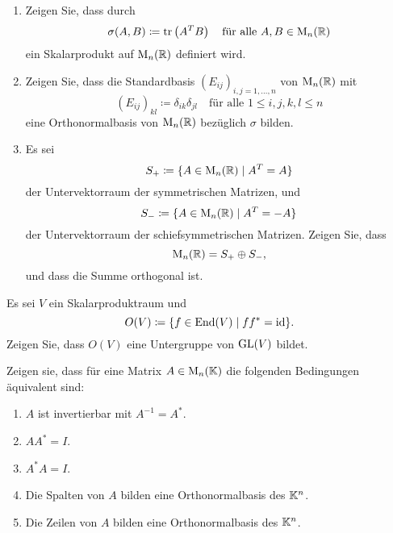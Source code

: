 \documentclass[a4paper,10pt]{scrartcl}
\begin{document}
\begin{question}
  \begin{enumerate}[leftmargin=*]
    \item
      Zeigen Sie, dass durch
      \[
        \sigma(A, B) \coloneqq \operatorname{tr}\left( A^T B \right)
        \quad
        \text{für alle $A, B \in \operatorname{M}_n(\mathbb{R})$}
      \]
      ein Skalarprodukt auf $\operatorname{M}_n(\mathbb{R})$ definiert wird.
    \item
      Zeigen Sie, dass die Standardbasis $(E_{ij})_{i,j=1,\dotsc,n}$ von $\operatorname{M}_n(\mathbb{R})$ mit
      \[
        (E_{ij})_{kl} \coloneqq \delta_{ik} \delta_{jl}
        \quad
        \text{für alle $1 \leq i,j,k,l \leq n$}
      \]
      eine Orthonormalbasis von $\operatorname{M}_n(\mathbb{R})$ bezüglich $\sigma$ bilden.
    \item
      Es sei
      \[
        S_+ \coloneqq \{A \in \operatorname{M}_n(\mathbb{R}) \mid A^T = A\}
      \]
      der Untervektorraum der symmetrischen Matrizen, und
      \[
        S_- \coloneqq \{A \in \operatorname{M}_n(\mathbb{R}) \mid A^T  = -A\}
      \]
      der Untervektorraum der schiefsymmetrischen Matrizen.
      Zeigen Sie, dass
      \[
        \operatorname{M}_n(\mathbb{R}) = S_+ \oplus S_-,
      \]
      und dass die Summe orthogonal ist.
  \end{enumerate}
\end{question}


\begin{question}
  Es sei $V$ ein Skalarproduktraum und
  \[
    O(V) \coloneqq \{ f \in \operatorname{End}(V) \mid f f^* = \operatorname{id} \}.
  \]
  Zeigen Sie, dass $O(V)$ eine Untergruppe von $\operatorname{GL}(V)$ bildet.
\end{question}


\begin{question}
Zeigen sie, dass für eine Matrix $A \in \operatorname{M}_n(\mathbb{K})$ die folgenden Bedingungen äquivalent sind:
  \begin{enumerate}
    \item
      $A$ ist invertierbar mit $A^{-1} = A^*$.
    \item
      $A A^* = I$.
    \item
      $A^* A = I$.
    \item
      Die Spalten von $A$ bilden eine Orthonormalbasis des $\mathbb{K}^n$.
    \item
      Die Zeilen von $A$ bilden eine Orthonormalbasis des $\mathbb{K}^n$.
  \end{enumerate}
\end{question}
\end{document}
